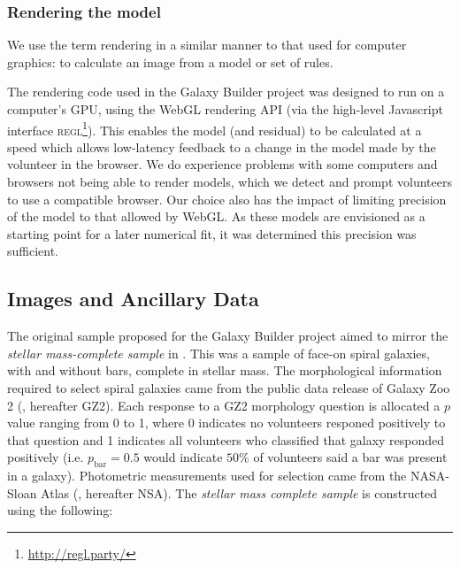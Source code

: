 \documentclass[../main.tex]{subfiles}
\begin{document}
\subsubsection{Rendering the model}

We use the term rendering in a similar manner to that used for computer graphics: to calculate an image from a model or set of rules.

The rendering code used in the Galaxy Builder project was designed to run on a computer's GPU, using the WebGL rendering API (via the high-level Javascript interface \textsc{regl}\footnote{\url{http://regl.party/}}). This enables the model (and residual) to be calculated at a speed which allows low-latency feedback to a change in the model made by the volunteer in the browser. We do experience problems with some computers and browsers not being able to render models, which we detect and prompt volunteers to use a compatible browser. Our choice also has the impact of limiting precision of the model to that allowed by WebGL. As these models are envisioned as a starting point for a later numerical fit, it was determined this precision was sufficient.

\subsection{Images and Ancillary Data}
\label{sec:data}
The original sample proposed for the Galaxy Builder project aimed to mirror the \textit{stellar mass-complete sample} in \citet{2017MNRAS.472.2263H}. This was a sample of face-on spiral galaxies, with and without bars, complete in stellar mass. The morphological information required to select spiral galaxies came from the public data release of Galaxy Zoo 2 (\citealt{Willett2013:1308.3496v2}, hereafter GZ2). Each response to a GZ2 morphology question is allocated a $p$ value ranging from 0 to 1, where 0 indicates no volunteers responed positively to that question and 1 indicates all volunteers who classified that galaxy responded positively (i.e. $p_\text{bar} = 0.5$ would indicate $50\%$ of volunteers said a bar was present in a galaxy). Photometric measurements used for selection came from the NASA-Sloan Atlas (\citealt{2011AJ....142...31B}, hereafter NSA). The \textit{stellar mass complete sample} is constructed using the following:
\end{document}
